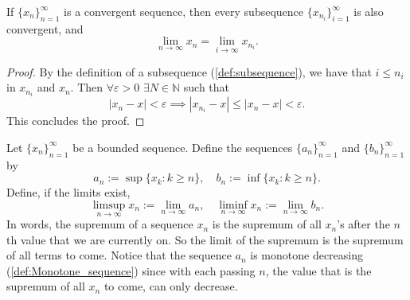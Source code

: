 \documentclass[../main.tex]{subfiles}
\begin{document}
    
    
    
    
    
    
    
    
    
    
    
    
    
    
    
    
    
    
    
    
    
    \begin{proposition} \label{prp:subsequence limit equal to limit}
    If \( \{x_n\}_{n=1}^{\infty} \) is a convergent sequence, then every subsequence \( \{x_{n_i}\}_{i=1}^{\infty} \) is also convergent, and
    \[
    \lim_{n \to \infty} x_n = \lim_{i \to \infty} x_{n_i}.
    \]
    \end{proposition}
    
    
    \begin{proof}
        By the definition of a subsequence (\ref{def:subsequence}), we have that $i \leq n_i$ in $x_{n_i}$ and $x_n$. Then $\forall \varepsilon > 0$ $\exists N \in \mathbb{N}$ such that \[|x_n-x|<\varepsilon \implies |x_{n_i} - x| \leq |x_n - x| < \varepsilon.\]
        This concludes the proof.
    \end{proof}
    
    
    
    
    
    
    
    
    
    
    
    
    
    
    
    
    
    
    
    
    
    
    
    
    \begin{definition} \label{def:limsup_liminf}
    Let \( \{x_n\}_{n=1}^{\infty} \) be a bounded sequence. Define the sequences \( \{a_n\}_{n=1}^{\infty} \) and \( \{b_n\}_{n=1}^{\infty} \) by
    \[
    a_n := \sup\{ x_k : k \geq n \}, \quad b_n := \inf\{ x_k : k \geq n \}.
    \]
    Define, if the limits exist,
    \[
    \limsup_{n \to \infty} x_n := \lim_{n \to \infty} a_n, \quad \liminf_{n \to \infty} x_n := \lim_{n \to \infty} b_n.
    \]
    In words, the supremum of a sequence $x_n$ is the supremum of all $x_n$'s after the $n$th value that we are currently on. So the limit of the supremum is the supremum of all terms to 
    come. Notice that the sequence $a_n$ is monotone decreasing (\ref{def:Monotone_sequence}) since 
    with each passing $n$, the value that is the supremum of all $x_n$ to come,
    can only decrease. 


    \end{definition}
    
\end{document}
